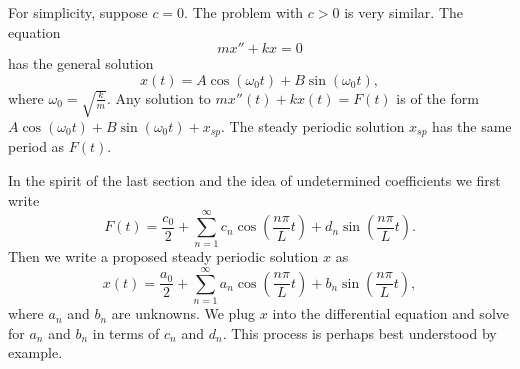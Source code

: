 For simplicity, suppose $c=0$.  The problem with $c > 0$ is very
similar.
The equation
\begin{equation*}
mx'' + kx = 0 
\end{equation*}
has the general solution
\begin{equation*}
x(t) = A \cos (\omega_0 t) + 
B \sin (\omega_0 t) ,
\end{equation*}
where $\omega_0 = \sqrt{\frac{k}{m}}$.
Any solution to
$mx''(t) + kx(t) = F(t)$ is of the form
$A \cos (\omega_0 t) + B \sin (\omega_0 t) + x_{sp}$.
The steady
periodic solution $x_{sp}$ has the same period as $F(t)$.

In the spirit of the last section and the idea of undetermined coefficients
we first write
\begin{equation*}
F(t) = \frac{c_0}{2} + \sum_{n=1}^\infty
c_n \cos \left( \frac{n \pi}{L} t \right) +
d_n \sin \left( \frac{n \pi}{L} t \right) .
\end{equation*}
Then we write a proposed steady periodic solution $x$ as
\begin{equation*}
x(t) = \frac{a_0}{2} + \sum_{n=1}^\infty
a_n \cos \left( \frac{n \pi}{L} t \right) +
b_n \sin \left( \frac{n \pi}{L} t \right) ,
\end{equation*}
where $a_n$ and $b_n$ are unknowns.
We plug $x$ into the differential equation and solve for $a_n$ and
$b_n$ in terms of $c_n$ and $d_n$.  This process
is perhaps best understood by example.
\pagebreak[2]

